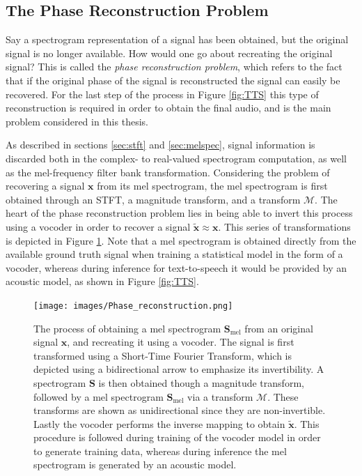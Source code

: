 \documentclass{report}
\begin{document}
\subsection{The Phase Reconstruction Problem} \label{sec:phaseprob}

Say a spectrogram representation of a signal has been obtained, but the original signal is no longer available. How would one go about recreating the original signal? This is called the \textit{phase reconstruction problem}, which refers to the fact that if the original phase of the signal is reconstructed the signal can easily be recovered. For the last step of the process in Figure \ref{fig:TTS} this type of reconstruction is required in order to obtain the final audio, and is the main problem considered in this thesis.

As described in sections \ref{sec:stft} and \ref{sec:melspec}, signal information is discarded both in the complex- to real-valued spectrogram computation, as well as the mel-frequency filter bank transformation. Considering the problem of recovering a signal $\bm{x}$ from its mel spectrogram, the mel spectrogram is first obtained through an STFT, a magnitude transform, and a transform $\mathcal{M}$. The heart of the phase reconstruction problem lies in being able to invert this process using a vocoder in order to recover a signal $\tilde{\bm{x}} \approx \bm{x}$. This series of transformations is depicted in Figure \ref{fig:phasere}. Note that a mel spectrogram is obtained directly from the available ground truth signal when training a statistical model in the form of a vocoder, whereas during inference for text-to-speech it would be provided by an acoustic model, as shown in Figure \ref{fig:TTS}.

\begin{figure}[H]
    \centering
    \texttt{[image: images/Phase\_reconstruction.png]}
    \caption{\onehalfspacing The process of obtaining a mel spectrogram $\bm{S}_{\text{mel}}$ from an original signal $\bm{x}$, and recreating it using a vocoder. The signal is first transformed using a Short-Time Fourier Transform, which is depicted using a bidirectional arrow to emphasize its invertibility. A spectrogram $\bm{S}$ is then obtained though a magnitude transform, followed by a mel spectrogram $\bm{S}_{\text{mel}}$ via a transform $\mathcal{M}$. These transforms are shown as unidirectional since they are non-invertible. Lastly the vocoder performs the inverse mapping to obtain $\tilde{\bm{x}}$. This procedure is followed during training of the vocoder model in order to generate training data, whereas during inference the mel spectrogram is generated by an acoustic model.}
    \label{fig:phasere}
\end{figure}
\end{document}
